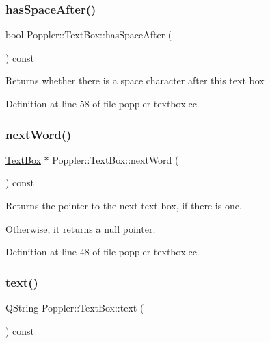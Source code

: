 \mbox{\label{class_poppler_1_1_text_box_a2c5f5c29a805dabe1cfd90bbd1eb0e11}} 
\subsubsection{\texorpdfstring{has\+Space\+After()}{hasSpaceAfter()}}
{\footnotesize\ttfamily bool Poppler\+::\+Text\+Box\+::has\+Space\+After (\begin{DoxyParamCaption}{ }\end{DoxyParamCaption}) const}

Returns whether there is a space character after this text box 

Definition at line 58 of file poppler-\/textbox.\+cc.

\mbox{\label{class_poppler_1_1_text_box_aec2e7151db7890883cccb9a4a7106bd1}} 
\subsubsection{\texorpdfstring{next\+Word()}{nextWord()}}
{\footnotesize\ttfamily \hyperlink{class_poppler_1_1_text_box}{Text\+Box} $\ast$ Poppler\+::\+Text\+Box\+::next\+Word (\begin{DoxyParamCaption}{ }\end{DoxyParamCaption}) const}

Returns the pointer to the next text box, if there is one.

Otherwise, it returns a null pointer. 

Definition at line 48 of file poppler-\/textbox.\+cc.

\mbox{\label{class_poppler_1_1_text_box_a80d723ab49d7a4f4d0537d0634984cfd}} 
\subsubsection{\texorpdfstring{text()}{text()}}
{\footnotesize\ttfamily Q\+String Poppler\+::\+Text\+Box\+::text (\begin{DoxyParamCaption}{ }\end{DoxyParamCaption}) const}

